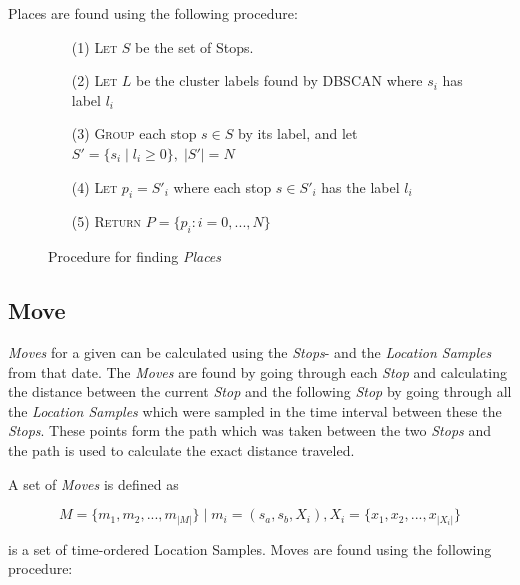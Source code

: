 Places are found using the following procedure:

\begin{figure}[h]
    \centering
    \begin{center}
    \begin{itemize}
    \item[(1)] \textsc{Let} $S$ be the set of Stops.
    \item[(2)] \textsc{Let} $L$ be the cluster labels found by  DBSCAN where $s_i$ has label $l_i$ 
    \item[(3)] \textsc{Group} each stop $s \in S$ by its label, and let $S' = \{s_i \;|\; l_i \geq 0\}, \;|S'| = N$
    \item[(4)] \textsc{Let} $p_i = S'_i$ where each stop $s \in S'_i$ has the label $l_i$
    \item[(5)] \textsc{Return} $P = \{p_i : i = 0, ..., N\}$
\end{itemize} 
\end{center}
    \caption{Procedure for finding \textit{Places}}
    \label{fig:find_places}
\end{figure}

\subsection{Move}
\textit{Moves} for a given can be calculated using the \textit{Stops}- and the \textit{Location Samples} from that date. The \textit{Moves} are found by going through each \textit{Stop} and calculating the distance between the current \textit{Stop} and the following \textit{Stop} by going through all the \textit{Location Samples} which were sampled in the time interval between these the \textit{Stops}. These points form the path which was taken between the two \textit{Stops} and the path is used to calculate the exact distance traveled.

A set of \textit{Moves} is defined as 

\begin{equation}
\label{eq:feature-moves}
M = \{m_1, m_2, ..., m_{|M|}\} \;| \; m_i = (s_a, s_b, X_i), X_i = \{x_1, x_2, ..., x_{|X_i|}\}
\end{equation}

is a set of time-ordered Location Samples. Moves are found using the following procedure:

